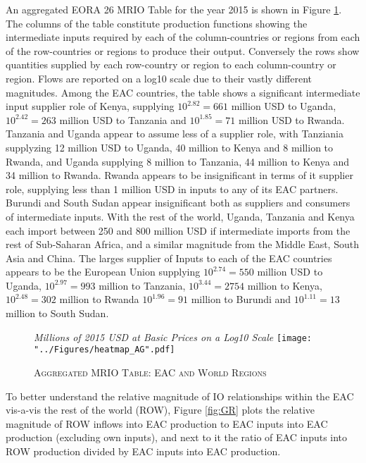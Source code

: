 \documentclass[a4paper]{article}
\begin{document}
An aggregated EORA 26 MRIO Table for the year 2015 is shown in Figure \ref{fig:wld}.  The columns of the table constitute production functions showing the intermediate inputs required by each of the column-countries or regions from each of the row-countries or regions to produce their output. Conversely the rows show quantities supplied by each row-country or region to each column-country or region. Flows are reported on a log10 scale due to their vastly different magnitudes. Among the EAC countries, the table shows a significant intermediate input supplier role of Kenya, supplying $10^{2.82} = 661$ million USD to Uganda, $10^{2.42} = 263$ million USD to Tanzania and  $10^{1.85} = 71$ million USD to Rwanda. Tanzania and Uganda appear to assume less of a supplier role, with Tanziania supplyzing 12 million USD to Uganda, 40 million to Kenya and 8 million to Rwanda, and Uganda supplying 8 million to Tanzania, 44 million to Kenya and 34 million to Rwanda. Rwanda appears to be insignificant in terms of it supplier role, supplying less than 1 million USD in inputs to any of its EAC partners. Burundi and South Sudan appear insignificant both as suppliers and consumers of intermediate inputs. With the rest of the world, Uganda, Tanzania and Kenya each import between 250 and 800 million USD if intermediate imports from the rest of Sub-Saharan Africa, and a similar magnitude from the Middle East, South Asia and China. The larges supplier of Inputs to each of the EAC countries appears to be the European Union supplying $10^{2.74} = 550$ million USD to Uganda, $10^{2.97} = 993$ million to Tanzania, $10^{3.44} = 2754$ million to Kenya, $10^{2.48} = 302$ million to Rwanda  $10^{1.96} = 91$ million to Burundi and $10^{1.11} = 13$ million to South Sudan. 

\begin{figure}[h!]
\centering
\caption{\label{fig:wld}\textsc{Aggregated MRIO Table: EAC and World Regions}}
\small{\textit{Millions of 2015 USD at Basic Prices on a Log10 Scale}}
\texttt{[image: "../Figures/heatmap\_AG".pdf]} %
\end{figure}
\FloatBarrier


To better understand the relative magnitude of IO relationships within the EAC vis-a-vis the rest of the world (ROW), Figure \ref{fig:GR} plots the relative magnitude of ROW inflows into EAC production to EAC inputs into EAC production (excluding own inputs), and next to it the ratio of EAC inputs into ROW production divided by EAC inputs into EAC production. 
\end{document}
